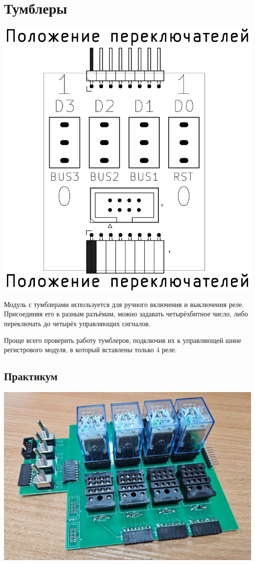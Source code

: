 \section{Тумблеры}

\begin{center}
\includegraphics{boards/switches.png}
\end{center}

Модуль с тумблерами используется для ручного включения и выключения реле.
Присоединяя его к разным разъёмам, можно задавать четырёхбитное число,
либо переключать до четырёх управляющих сигналов.

Проще всего проверить работу тумблеров, подключив их к управляющей шине
регистрового модуля, в который вставлены только $4$ реле.

\subsection{Практикум}

\includegraphics[width=0.5\columnwidth]{photo/switches.jpg}

